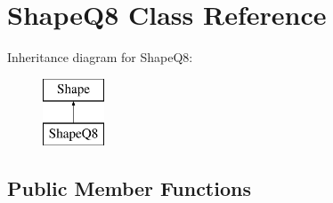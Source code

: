 \hypertarget{class_shape_q8}{}\section{Shape\+Q8 Class Reference}
\label{class_shape_q8}
Inheritance diagram for Shape\+Q8\+:\begin{figure}[H]
\begin{center}
\leavevmode
\includegraphics[height=2.000000cm]{class_shape_q8}
\end{center}
\end{figure}
\subsection*{Public Member Functions}
